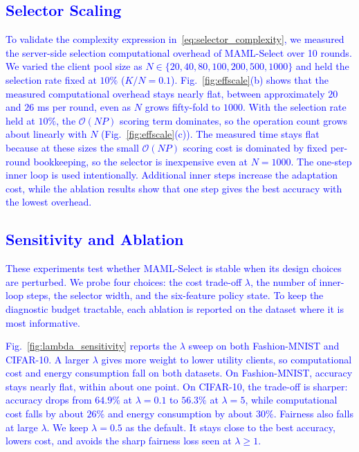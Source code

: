 \documentclass[journal]{IEEEtran}
\newcommand{\revision}[1]{\textcolor{blue}{#1}}
\begin{document}
\subsection{\revision{Selector Scaling}}
\revision{To validate the complexity expression in~\eqref{eq:selector_complexity}, we measured the server-side selection computational overhead of MAML-Select over 10 rounds. We varied the client pool size as $N\in\{20,40,80,100,200,500,1000\}$ and held the selection rate fixed at $10\%$ ($K/N=0.1$). Fig.~\ref{fig:effscale}(b) shows that the measured computational overhead stays nearly flat, between approximately $20$ and $26$ ms per round, even as $N$ grows fifty-fold to $1000$.
With the selection rate held at $10\%$, the $\mathcal{O}(NP)$ scoring term dominates, so the operation count grows about linearly with $N$ (Fig.~\ref{fig:effscale}(c)). The measured time stays flat because at these sizes the small $\mathcal{O}(NP)$ scoring cost is dominated by fixed per-round bookkeeping, so the selector is inexpensive even at $N=1000$. The one-step inner loop is used intentionally. Additional inner steps increase the adaptation cost, while the ablation results show that one step gives the best accuracy with the lowest overhead.}

\subsection{\revision{Sensitivity and Ablation}}
\revision{These experiments test whether MAML-Select is stable when its design choices are perturbed. We probe four choices: the cost trade-off $\lambda$, the number of inner-loop steps, the selector width, and the six-feature policy state. To keep the diagnostic budget tractable, each ablation is reported on the dataset where it is most informative.}

\revision{Fig.~\ref{fig:lambda_sensitivity} reports the $\lambda$ sweep on both Fashion-MNIST and CIFAR-10. A larger $\lambda$ gives more weight to lower utility clients, so computational cost and energy consumption fall on both datasets. On Fashion-MNIST, accuracy stays nearly flat, within about one point. On CIFAR-10, the trade-off is sharper: accuracy drops from $64.9\%$ at $\lambda=0.1$ to $56.3\%$ at $\lambda=5$, while computational cost falls by about $26\%$ and energy consumption by about $30\%$. Fairness also falls at large $\lambda$. We keep $\lambda=0.5$ as the default. It stays close to the best accuracy, lowers cost, and avoids the sharp fairness loss seen at $\lambda\ge1$.}
\end{document}
